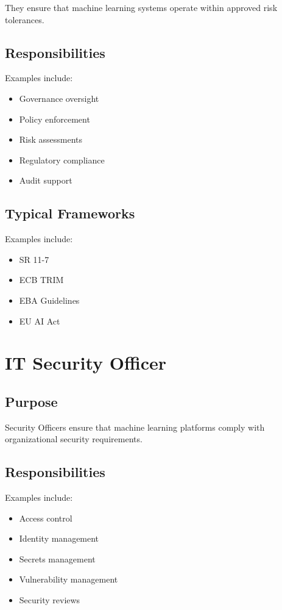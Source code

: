 They ensure that machine learning systems operate within approved risk tolerances.

\subsection{Responsibilities}

Examples include:

\begin{itemize}
    \item Governance oversight
    \item Policy enforcement
    \item Risk assessments
    \item Regulatory compliance
    \item Audit support
\end{itemize}

\subsection{Typical Frameworks}

Examples include:

\begin{itemize}
    \item SR 11-7
    \item ECB TRIM
    \item EBA Guidelines
    \item EU AI Act
\end{itemize}

\section{IT Security Officer}

\subsection{Purpose}

Security Officers ensure that machine learning platforms comply with organizational security requirements.

\subsection{Responsibilities}

Examples include:

\begin{itemize}
    \item Access control
    \item Identity management
    \item Secrets management
    \item Vulnerability management
    \item Security reviews
\end{itemize}

